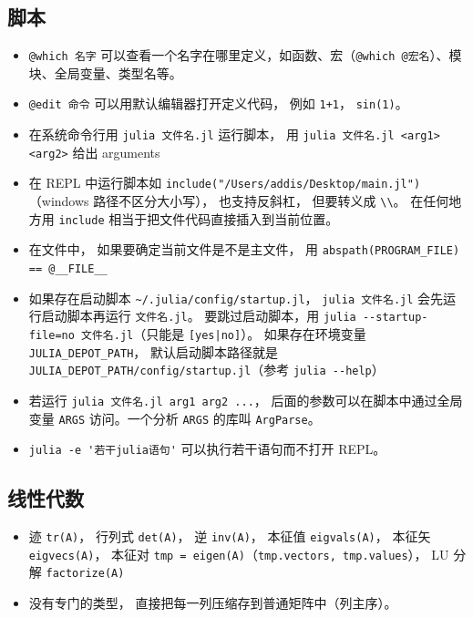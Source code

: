 \subsection{脚本}
\begin{itemize}
\item \verb`@which 名字` 可以查看一个名字在哪里定义，如函数、宏（\verb`@which @宏名`）、模块、全局变量、类型名等。
\item \verb`@edit 命令` 可以用默认编辑器打开定义代码， 例如 \verb`1+1`， \verb`sin(1)`。
\item 在系统命令行用 \verb`julia 文件名.jl` 运行脚本， 用 \verb`julia 文件名.jl <arg1> <arg2>` 给出 arguments
\item 在 REPL 中运行脚本如 \verb`include("/Users/addis/Desktop/main.jl")`（windows 路径不区分大小写）， 也支持反斜杠， 但要转义成 \verb`\\`。 在任何地方用 \verb`include` 相当于把文件代码直接插入到当前位置。
\item 在文件中， 如果要确定当前文件是不是主文件， 用 \verb`abspath(PROGRAM_FILE) == @__FILE__`
\item 如果存在启动脚本 \verb`~/.julia/config/startup.jl`， \verb`julia 文件名.jl` 会先运行启动脚本再运行 \verb`文件名.jl`。 要跳过启动脚本，用 \verb`julia --startup-file=no 文件名.jl`（只能是 \verb`[yes|no]`）。 如果存在环境变量 \verb`JULIA_DEPOT_PATH`， 默认启动脚本路径就是 \verb`JULIA_DEPOT_PATH/config/startup.jl`（参考 \verb`julia --help`）
\item 若运行 \verb`julia 文件名.jl arg1 arg2 ...`， 后面的参数可以在脚本中通过全局变量 \verb`ARGS` 访问。一个分析 \verb`ARGS` 的库叫 \verb`ArgParse`。
\item \verb`julia -e '若干julia语句'` 可以执行若干语句而不打开 REPL。
\end{itemize}


\subsection{线性代数}
\begin{itemize}
\item 迹 \verb`tr(A)`， 行列式 \verb`det(A)`， 逆 \verb`inv(A)`， 本征值 \verb`eigvals(A)`， 本征矢 \verb`eigvecs(A)`， 本征对 \verb`tmp = eigen(A)`（\verb`tmp.vectors, tmp.values`）， LU 分解%
 \verb`factorize(A)`
\item {}没有专门的类型， 直接把每一列压缩存到普通矩阵中（列主序）。
\end{itemize}

